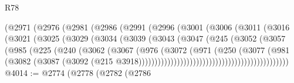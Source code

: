 \begin{lexlean}{R78}
\begin{coremodule}
                            (@2971
                              (@2976
                                (@2981
                                  (@2986
                                    (@2991
                                      (@2996
                                        (@3001
                                          (@3006
                                            (@3011
                                              (@3016
                                                (@3021
                                                  (@3025
                                                    (@3029
                                                      (@3034
                                                        (@3039
                                                          (@3043
                                                            (@3047
                                                              (@245
                                                                (@3052
                                                                  (@3057
                                                                    (@985
                                                                      (@225
                                                                        (@240
                                                                          (@3062
                                                                            (@3067
                                                                              (@976
                                                                                (@3072
                                                                                  (@971
                                                                                    (@250
                                                                                      (@3077
                                                                                        (@981
                                                                                          (@3082
                                                                                            (@3087
                                                                                              (@3092
                                                                                                (@215
                                                                                                  @3918)))))))))))))))))))))))))))))))))))))))))))))))
@4014 := @2774
    (@2778
      (@2782
        (@2786

\end{coremodule}
\end{lexlean}
